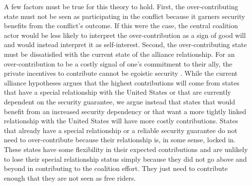 \documentclass[12pt,letterpaper]{article}
\begin{document}
		A few factors must be true for this theory to hold. First, the over-contributing state must not be seen as participating in the conflict because it garners security benefits from the conflict's outcome. If this were the case, the central coalition actor would be less likely to interpret the over-contribution as a sign of good will and would instead interpret it as self-interest. Second, the over-contributing state must be dissatisfied with the current state of the alliance relationship. For an over-contribution to be a costly signal of one's commitment to their ally, the private incentives to contribute cannot be egoistic security \citep{davidson_americaallieswar_2011}. While the current alliance hypotheses argues that the highest contributions will come from states that have a special relationship with the United States or that are currently dependent on the security guarantee, we argue instead that states that would benefit from an increased security dependency or that want a more tightly linked relationship with the United States will have more costly contributions. States that already have a special relationship or a reliable security guarantee do not need to over-contribute because their relationship is, in some sense, locked in. These states have some flexibility in their expected contributions and are unlikely to lose their special relationship status simply because they did not go above and beyond in contributing to the coalition effort. They just need to contribute enough that they are not seen as free riders.
\end{document}
